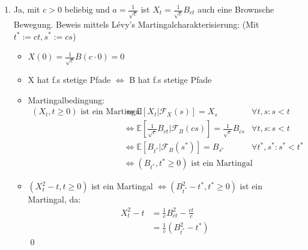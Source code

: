 \documentclass[a4paper,11pt,notitlepage,fullpage]{article}
\newcommand{\E}{\mathbb{E}}
\newcommand{\F}{\mathcal{F}}
\begin{document}
\begin{enumerate}
\item Ja, mit $c > 0$ beliebig und $a = \frac{1}{\sqrt c}$ ist $X_t = \frac{1}{\sqrt c}B_{ct}$ auch eine Brownsche Bewegung. Beweis mittels Lévy’s Martingalcharakterisierung: (Mit $t^* := ct, s^* := cs$)
\begin{itemize}
\item $X(0) = \frac{1}{\sqrt c} B(c\cdot 0) = 0$
\item X hat f.s stetige Pfade $\Leftrightarrow$ B hat f.s stetige Pfade
\item Martingalbedingung:
\begin{align*}
(X_t, t\geq0) \text{ ist ein Martingal} &\Leftrightarrow \E[X_t | \F_X(s)] = X_s &\forall t, s: s < t\\
&\Leftrightarrow \E[\frac{1}{\sqrt c}B_{ct} | \F_B(cs)] = \frac{1}{\sqrt c}B_{cs} &\forall t, s: s < t\\
&\Leftrightarrow \E[B_{t^*} | \F_B(s^*)] = B_{s^*} &\forall t^*, s^*: s^* < t^*\\
&\Leftrightarrow (B_{t^*}, t^*\geq0) \text{ ist ein Martingal}
\end{align*}
\item $(X_t^2 - t, t\geq0)$ ist ein Martingal $\Leftrightarrow (B_{t^*}^2 - t^*, t^*\geq 0)$ ist ein Martingal, da:
\begin{align*}
X_t^2 - t &= \frac{1}{c}B_{ct}^2 - \frac{ct}{c} \\
&= \frac{1}{c} (B_{t^*}^2 - t^*)
\end{align*} \qed

\end{itemize}




\end{enumerate}
\end{document}
